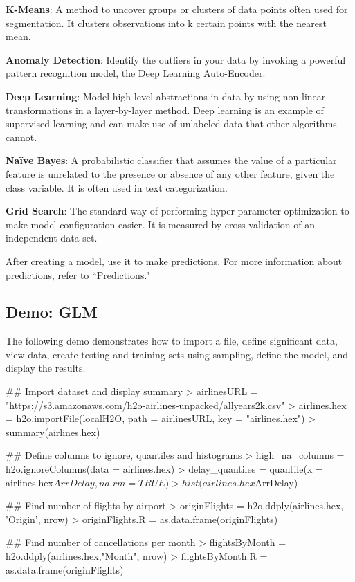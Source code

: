 \documentclass[11pt]{article}
\begin{document}
{{\textbf{K-Means}}: A method to uncover groups or clusters of data points often used for segmentation. It clusters observations into k certain points with the nearest mean.

{\textbf{Anomaly Detection}}: Identify the outliers in your data by invoking a powerful pattern recognition model, the Deep Learning Auto-Encoder.

{\textbf{Deep Learning}}: Model high-level abstractions in data by using non-linear transformations in a layer-by-layer method. Deep learning is an example of supervised learning and can make use of unlabeled data that other algorithms cannot.

{\textbf{Na\"{i}ve Bayes}}: A probabilistic classifier that assumes the value of a particular feature is unrelated to the presence or absence of any other feature, given the class variable. It is often used in text categorization.

{\textbf{Grid Search}}: The standard way of performing hyper-parameter optimization to make model configuration easier. It is measured by cross-validation of an independent data set.

After creating a model, use it to make predictions. For more information about predictions, refer to ``Predictions." 

\subsection{Demo: GLM}

The following demo demonstrates how to import a file, define significant data, view data, create testing and training sets using sampling, define the model, and display the results.

\begin{spverbatim}
## Import dataset and display summary
> airlinesURL = "https://s3.amazonaws.com/h2o-airlines-unpacked/allyears2k.csv"
> airlines.hex = h2o.importFile(localH2O, path = airlinesURL, key = "airlines.hex")
> summary(airlines.hex)

## Define columns to ignore, quantiles and histograms
> high_na_columns = h2o.ignoreColumns(data = airlines.hex)
> delay_quantiles = quantile(x = airlines.hex$ArrDelay, na.rm = TRUE)
> hist(airlines.hex$ArrDelay)

## Find number of flights by airport
> originFlights = h2o.ddply(airlines.hex, 'Origin', nrow)
> originFlights.R = as.data.frame(originFlights)

## Find number of cancellations per month
> flightsByMonth = h2o.ddply(airlines.hex,"Month", nrow)
> flightsByMonth.R = as.data.frame(originFlights)


\end{spverbatim}}
\end{document}
